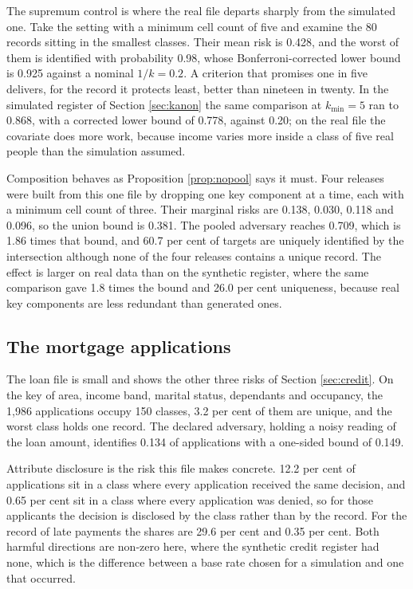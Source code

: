 \documentclass[11pt,a4paper]{article}
\theoremstyle{plain}
\theoremstyle{definition}
\begin{document}


The supremum control is where the real file departs sharply from the simulated
one. Take the setting with a minimum cell count of five and examine the 80 records
sitting in the smallest classes. Their mean risk is 0.428, and the worst of them is
identified with probability 0.98, whose Bonferroni-corrected lower bound is 0.925
against a nominal $1/k = 0.2$. A criterion that promises one in five delivers,
for the record it protects least, better than nineteen in twenty. In the simulated
register of Section \ref{sec:kanon} the same comparison at $k_{\min}=5$ ran to
0.868, with a corrected lower bound of 0.778, against 0.20;
on the real file the covariate does more work, because income varies more inside a
class of five real people than the simulation assumed.

Composition behaves as Proposition \ref{prop:nopool} says it must. Four releases
were built from this one file by dropping one key component at a time, each with a
minimum cell count of three. Their marginal risks are 0.138, 0.030, 0.118 and
0.096, so the union bound is 0.381. The pooled adversary reaches 0.709, which is
1.86 times that bound, and 60.7 per cent of targets are uniquely identified by the
intersection although none of the four releases contains a unique record. The
effect is larger on real data than on the synthetic register, where the same
comparison gave 1.8 times the bound and 26.0 per cent uniqueness, because real key
components are less redundant than generated ones.

\subsection{The mortgage applications}

The loan file is small and shows the other three risks of Section
\ref{sec:credit}. On the key of area, income band, marital status, dependants and
occupancy, the 1,986 applications occupy 150 classes, 3.2 per cent of them are
unique, and the worst class holds one record. The declared adversary, holding a noisy reading of the loan
amount, identifies 0.134 of applications with a one-sided bound of 0.149.

Attribute disclosure is the risk this file makes concrete. 12.2 per cent of
applications sit in a class where every application received the same decision,
and 0.65 per cent sit in a class where every application was denied, so for those
applicants the decision is disclosed by the class rather than by the record. For
the record of late payments the shares are 29.6 per cent and 0.35 per cent. Both
harmful directions are non-zero here, where the synthetic credit register had
none, which is the difference between a base rate chosen for a simulation and one
that occurred.
\end{document}
